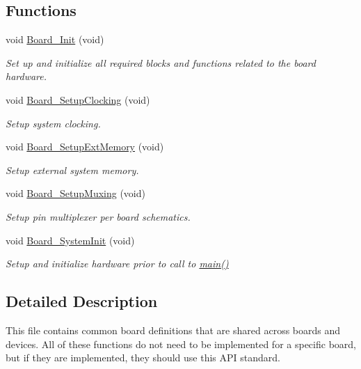 \subsection*{Functions}
\begin{DoxyCompactItemize}
\item 
void \hyperlink{group__BOARD__COMMON__API_gae8d2d761b984f48c3dbb27dd32a8c119}{Board\+\_\+\+Init} (void)
\begin{DoxyCompactList}\small\item\em Set up and initialize all required blocks and functions related to the board hardware. \end{DoxyCompactList}\item 
void \hyperlink{group__BOARD__COMMON__API_gae417dc93d00f1a89f74220e569fac777}{Board\+\_\+\+Setup\+Clocking} (void)
\begin{DoxyCompactList}\small\item\em Setup system clocking. \end{DoxyCompactList}\item 
void \hyperlink{group__BOARD__COMMON__API_ga27d97e44ce026a509b12317e059b2204}{Board\+\_\+\+Setup\+Ext\+Memory} (void)
\begin{DoxyCompactList}\small\item\em Setup external system memory. \end{DoxyCompactList}\item 
void \hyperlink{group__BOARD__COMMON__API_ga8ac1dc465c66e1cc00f5ffd346904d97}{Board\+\_\+\+Setup\+Muxing} (void)
\begin{DoxyCompactList}\small\item\em Setup pin multiplexer per board schematics. \end{DoxyCompactList}\item 
void \hyperlink{group__BOARD__COMMON__API_gaeb60ea85499a4208167ae2540086516a}{Board\+\_\+\+System\+Init} (void)
\begin{DoxyCompactList}\small\item\em Setup and initialize hardware prior to call to \hyperlink{group__Application__Layer_ga840291bc02cba5474a4cb46a9b9566fe}{main()} \end{DoxyCompactList}\end{DoxyCompactItemize}


\subsection{Detailed Description}
This file contains common board definitions that are shared across boards and devices. All of these functions do not need to be implemented for a specific board, but if they are implemented, they should use this A\+PI standard. 

